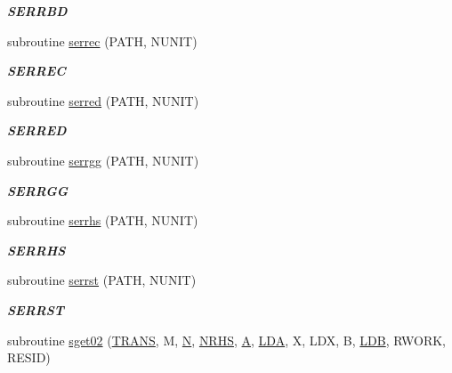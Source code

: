 \begin{DoxyCompactItemize}
\begin{DoxyCompactList}\small\item\em {\bfseries S\+E\+R\+R\+B\+D} \end{DoxyCompactList}\item 
subroutine \hyperlink{group__single__eig_ga53ee6e84c6661f0c5f453945a0c6693d}{serrec} (P\+A\+T\+H, N\+U\+N\+I\+T)
\begin{DoxyCompactList}\small\item\em {\bfseries S\+E\+R\+R\+E\+C} \end{DoxyCompactList}\item 
subroutine \hyperlink{group__single__eig_gadd1c890cd165b23a2c57f8e0ea2e02dd}{serred} (P\+A\+T\+H, N\+U\+N\+I\+T)
\begin{DoxyCompactList}\small\item\em {\bfseries S\+E\+R\+R\+E\+D} \end{DoxyCompactList}\item 
subroutine \hyperlink{group__single__eig_ga451a5d8e7e6e4ccb9e1f1fb915c022c0}{serrgg} (P\+A\+T\+H, N\+U\+N\+I\+T)
\begin{DoxyCompactList}\small\item\em {\bfseries S\+E\+R\+R\+G\+G} \end{DoxyCompactList}\item 
subroutine \hyperlink{group__single__eig_ga6fd701d129a4ff99faeb82018435d60c}{serrhs} (P\+A\+T\+H, N\+U\+N\+I\+T)
\begin{DoxyCompactList}\small\item\em {\bfseries S\+E\+R\+R\+H\+S} \end{DoxyCompactList}\item 
subroutine \hyperlink{group__single__eig_gae70b9c462a9febd73364f58aa8f4ad81}{serrst} (P\+A\+T\+H, N\+U\+N\+I\+T)
\begin{DoxyCompactList}\small\item\em {\bfseries S\+E\+R\+R\+S\+T} \end{DoxyCompactList}\item 
subroutine \hyperlink{group__single__eig_ga3c268bce93f7da1dd297b590955402dd}{sget02} (\hyperlink{superlu__enum__consts_8h_a0c4e17b2d5cea33f9991ccc6a6678d62a1f61e3015bfe0f0c2c3fda4c5a0cdf58}{T\+R\+A\+N\+S}, M, \hyperlink{polmisc_8c_a0240ac851181b84ac374872dc5434ee4}{N}, \hyperlink{example__user_8c_aa0138da002ce2a90360df2f521eb3198}{N\+R\+H\+S}, \hyperlink{classA}{A}, \hyperlink{example__user_8c_ae946da542ce0db94dced19b2ecefd1aa}{L\+D\+A}, X, L\+D\+X, B, \hyperlink{example__user_8c_a50e90a7104df172b5a89a06c47fcca04}{L\+D\+B}, R\+W\+O\+R\+K, R\+E\+S\+I\+D)

\end{DoxyCompactItemize}
